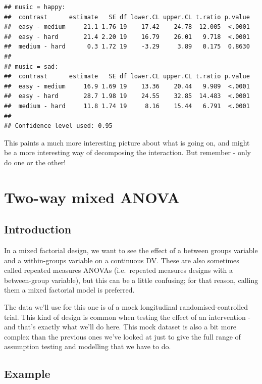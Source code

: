 \documentclass[
]{book}
\begin{document}
\begin{verbatim}
## music = happy:
##  contrast      estimate   SE df lower.CL upper.CL t.ratio p.value
##  easy - medium     21.1 1.76 19    17.42    24.78  12.005  <.0001
##  easy - hard       21.4 2.20 19    16.79    26.01   9.718  <.0001
##  medium - hard      0.3 1.72 19    -3.29     3.89   0.175  0.8630
## 
## music = sad:
##  contrast      estimate   SE df lower.CL upper.CL t.ratio p.value
##  easy - medium     16.9 1.69 19    13.36    20.44   9.989  <.0001
##  easy - hard       28.7 1.98 19    24.55    32.85  14.483  <.0001
##  medium - hard     11.8 1.74 19     8.16    15.44   6.791  <.0001
## 
## Confidence level used: 0.95
\end{verbatim}

This paints a much more interesting picture about what is going on, and might be a more interesting way of decomposing the interaction. But remember - only do one or the other!

\hypertarget{two-way-mixed-anova}{%
\section{Two-way mixed ANOVA}\label{two-way-mixed-anova}}

\hypertarget{introduction-3}{%
\subsection{Introduction}\label{introduction-3}}

In a mixed factorial design, we want to see the effect of a between groups variable and a within-groups variable on a continuous DV. These are also sometimes called repeated measures ANOVAs (i.e.~repeated measures designs with a between-group variable), but this can be a little confusing; for that reason, calling them a mixed factorial model is preferred.

The data we'll use for this one is of a mock longitudinal randomised-controlled trial. This kind of design is common when testing the effect of an intervention - and that's exactly what we'll do here. This mock dataset is also a bit more complex than the previous ones we've looked at just to give the full range of assumption testing and modelling that we have to do.

\hypertarget{example-4}{%
\subsection{Example}\label{example-4}}
\end{document}
